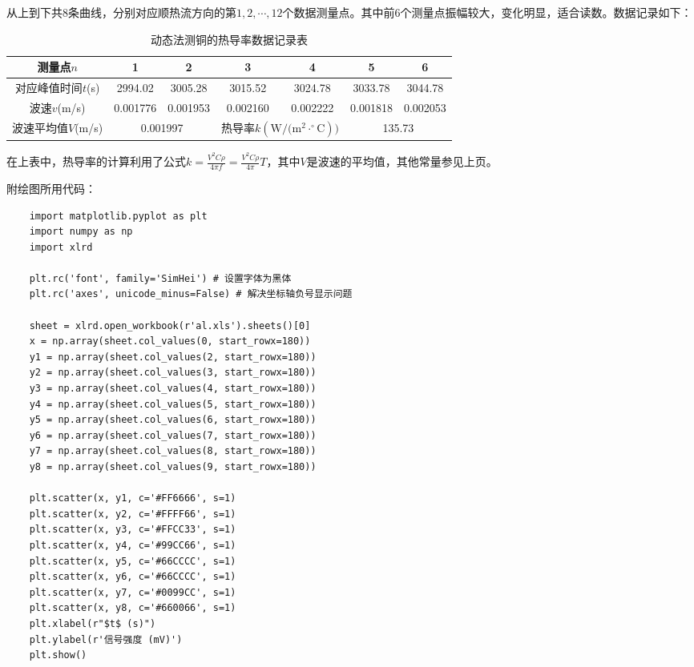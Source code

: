 \documentclass[12pt]{article}
\begin{document}
从上到下共8条曲线，分别对应顺热流方向的第$1,2,\cdots,12$个数据测量点。其中前6个测量点振幅较大，变化明显，适合读数。数据记录如下：

\begin{table}[htbp]
    \centering
    \begin{tabular}{|c|c|c|c|c|c|c|}
    \hline
    测量点$n$ & 1    & 2    & 3    & 4    & 5    & 6 \\
    \hline
    对应峰值时间$t$(s) & 2994.02 & 3005.28 & 3015.52 & 3024.78 & 3033.78 & 3044.78 \\
    \hline
    波速$v$(m/s) & 0.001776  & 0.001953  & 0.002160  & 0.002222  & 0.001818  & 0.002053  \\
    \hline
    波速平均值$V$(m/s) & \multicolumn{2}{|c|}{0.001997 } & \multicolumn{2}{c}{热导率$k(\mathrm{W/(m^2}\cdot^{\circ}\mathrm{C}))$}  & \multicolumn{2}{|c|}{135.73} \\
    \hline
    \end{tabular}
    \caption{动态法测铜的热导率数据记录表}
\end{table}

在上表中，热导率的计算利用了公式$k=\frac{V^2C\rho}{4\pi f}=\frac{V^2C\rho}{4\pi}T$，其中$V$是波速的平均值，其他常量参见上页。

附绘图所用代码：

\begin{lstlisting}
    import matplotlib.pyplot as plt
    import numpy as np
    import xlrd
    
    plt.rc('font', family='SimHei') # 设置字体为黑体
    plt.rc('axes', unicode_minus=False) # 解决坐标轴负号显示问题
    
    sheet = xlrd.open_workbook(r'al.xls').sheets()[0]
    x = np.array(sheet.col_values(0, start_rowx=180))
    y1 = np.array(sheet.col_values(2, start_rowx=180))
    y2 = np.array(sheet.col_values(3, start_rowx=180))
    y3 = np.array(sheet.col_values(4, start_rowx=180))
    y4 = np.array(sheet.col_values(5, start_rowx=180))
    y5 = np.array(sheet.col_values(6, start_rowx=180))
    y6 = np.array(sheet.col_values(7, start_rowx=180))
    y7 = np.array(sheet.col_values(8, start_rowx=180))
    y8 = np.array(sheet.col_values(9, start_rowx=180))
    
    plt.scatter(x, y1, c='#FF6666', s=1)
    plt.scatter(x, y2, c='#FFFF66', s=1)
    plt.scatter(x, y3, c='#FFCC33', s=1)
    plt.scatter(x, y4, c='#99CC66', s=1)
    plt.scatter(x, y5, c='#66CCCC', s=1)
    plt.scatter(x, y6, c='#66CCCC', s=1)
    plt.scatter(x, y7, c='#0099CC', s=1)
    plt.scatter(x, y8, c='#660066', s=1)
    plt.xlabel(r"$t$ (s)")
    plt.ylabel(r'信号强度 (mV)')
    plt.show()
\end{lstlisting}
\end{document}
